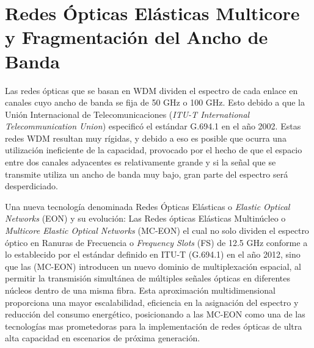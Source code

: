 \chapter{Redes Ópticas Elásticas Multicore y Fragmentación del Ancho de Banda}
Las redes ópticas que se basan en WDM dividen el espectro de cada enlace en canales cuyo ancho de banda se fija de 50 GHz o 100 GHz. Esto debido a que la Unión Internacional de Telecomunicaciones (\textit{ITU-T International Telecommunication Union}) especificó el estándar G.694.1 en el año 2002.
%
Estas redes WDM resultan muy rígidas, y debido a eso es posible que ocurra una utilización ineficiente de la capacidad, provocado por el hecho de que el espacio entre dos canales adyacentes es relativamente grande y si la señal que se transmite utiliza un ancho de banda muy bajo, gran parte del espectro será desperdiciado.
%

Una nueva tecnología denominada Redes Ópticas Elásticas o \textit{Elastic Optical Networks} (EON) y su evolución: Las Redes ópticas Elásticas Multinúcleo o \textit{Multicore Elastic Optical Networks} (MC-EON) el cual no solo dividen el espectro óptico en Ranuras de Frecuencia o \textit{Frequency Slots} (FS) de 12.5 GHz conforme a lo establecido por el estándar definido en ITU-T (G.694.1) en el año 2012, sino que las (MC-EON) introducen un nuevo dominio de multiplexación espacial, al permitir la transmisión simultánea de múltiples señales ópticas en diferentes núcleos dentro de una misma fibra.
%
Esta aproximación multidimensional proporciona una mayor escalabilidad, eficiencia en la asignación del espectro y reducción del consumo energético, posicionando a las MC-EON como una de las tecnologías mas prometedoras para la implementación de redes ópticas de ultra alta capacidad en escenarios de próxima generación.
%



